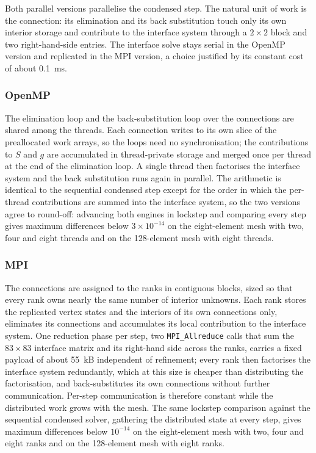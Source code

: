 \documentclass[11pt,a4paper]{article}
\begin{document}
Both parallel versions parallelise the condensed step. The natural unit of
work is the connection: its elimination and its back substitution touch
only its own interior storage and contribute to the interface system
through a $2\times 2$ block and two right-hand-side entries. The interface
solve stays serial in the OpenMP version and replicated in the MPI version,
a choice justified by its constant cost of about 0.1~ms.

\subsubsection{OpenMP}

The elimination loop and the back-substitution loop over the connections
are shared among the threads. Each connection writes to its own slice of
the preallocated work arrays, so the loops need no synchronisation; the
contributions to $S$ and $g$ are accumulated in thread-private storage and
merged once per thread at the end of the elimination loop. A single thread
then factorises the interface system and the back substitution runs again
in parallel. The arithmetic is identical to the sequential condensed step
except for the order in which the per-thread contributions are summed into
the interface system, so the two versions agree to round-off: advancing
both engines in lockstep and comparing every step gives maximum differences
below $3\times10^{-14}$ on the eight-element mesh with two, four and eight
threads and on the 128-element mesh with eight threads.

\subsubsection{MPI}

The connections are assigned to the ranks in contiguous blocks, sized so
that every rank owns nearly the same number of interior unknowns. Each rank
stores the replicated vertex states and the interiors of its own
connections only, eliminates its connections and accumulates its local
contribution to the interface system. One reduction phase per step, two
\texttt{MPI\_Allreduce} calls that sum the $83\times 83$ interface matrix
and its right-hand side across the ranks, carries a fixed payload of about
55~kB independent of refinement; every rank then factorises the interface system
redundantly, which at this size is cheaper than distributing the
factorisation, and back-substitutes its own connections without further
communication. Per-step communication is therefore constant while the
distributed work grows with the mesh. The same lockstep comparison against
the sequential condensed solver, gathering the distributed state at every
step, gives maximum differences below $10^{-14}$ on the eight-element mesh
with two, four and eight ranks and on the 128-element mesh with eight
ranks.
\end{document}
